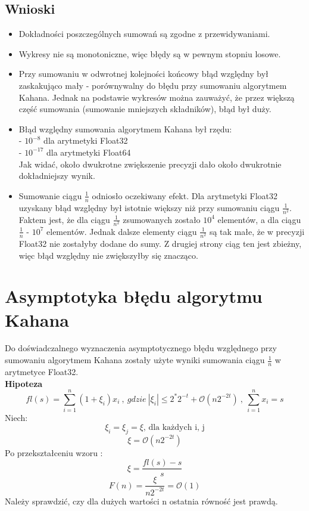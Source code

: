 \documentclass{article}
\begin{document}
	\subsection{Wnioski}
	
	\begin{itemize}
		\item Dokładności poszczególnych sumowań są zgodne z przewidywaniami.
		\item Wykresy nie są monotoniczne, więc błędy są w pewnym stopniu losowe.
		\item Przy sumowaniu w odwrotnej kolejności końcowy błąd względny był zaskakująco mały - porównywalny do błędu przy sumowaniu algorytmem Kahana. Jednak na podstawie wykresów można zauważyć, że przez większą część sumowania (sumowanie mniejszych składników), błąd był duży.
		\item Błąd względny sumowania algorytmem Kahana był rzędu: \\
			- $10^{-8}$ dla arytmetyki Float32 \\
			- $10^{-17}$ dla arytmetyki Float64 \\
		 Jak widać, około dwukrotne zwiększenie precyzji dało około dwukrotnie dokładniejszy wynik.
		 \item Sumowanie ciągu $\frac{1}{n}$ odniosło oczekiwany efekt. Dla arytmetyki Float32 uzyskany błąd względny był istotnie większy niż przy sumowaniu ciągu $\frac{1}{n^2}$. Faktem jest, że dla ciągu $\frac{1}{n^2}$ zsumowanych zostało $10^4$ elementów, a dla ciągu $\frac{1}{n}$ - $10^7$ elementów. Jednak dalsze elementy ciągu $\frac{1}{n^2}$ są tak małe, że w precyzji Float32 nie zostałyby dodane do sumy. Z drugiej strony ciąg ten jest zbieżny, więc błąd względny nie zwiększyłby się znacząco.
	\end{itemize}
	
	\section{Asymptotyka błędu algorytmu Kahana}
	Do doświadczalnego wyznaczenia asymptotycznego błędu względnego przy sumowaniu algorytmem Kahana zostały użyte wyniki sumowania ciągu $\frac{1}{n}$ w arytmetyce Float32. \\
	\textbf{Hipoteza} \\
	$$ fl(s) = \sum\limits_{i=1}^n (1+\xi_{i})x_{i} \ , \ gdzie \ |\xi_{i}| \le 2^*2^{-t} + \mathcal{O}(n 			2^{-2t}) \ , \ \sum\limits_{i=1}^n x_{i} = s  $$
	Niech:
	$$ \xi_{i} = \xi_{j} = \xi \text{, dla każdych i, j}  $$
	$$ \xi = \mathcal{O}(n 2^{-2t})  $$
	Po przekształceniu wzoru :
	$$ \xi = \frac{fl(s) - s}{s} $$ 
	$$ F(n) = \frac{\xi}{n2^{-2t}} = \mathcal{O}(1) $$
	Należy sprawdzić, czy dla dużych wartości n ostatnia równość jest prawdą.
\end{document}
